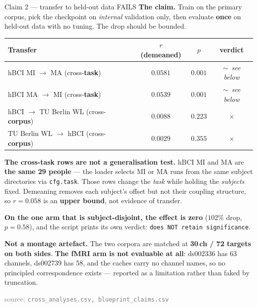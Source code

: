 \documentclass[aspectratio=169,11pt]{beamer}
\newcommand{\no}{\textcolor{bad}{\ensuremath{\times}}}
\newcommand{\pmark}{\textcolor{warn}{\ensuremath{\sim}}}
\newcommand{\src}[1]{{\scriptsize\textcolor{gray}{source: \texttt{#1}}}}
\begin{document}
\begin{frame}{Claim 2 --- transfer to held-out data \quad \textcolor{bad}{FAILS}}
\textbf{The claim.} Train on the primary corpus, pick the checkpoint on
\emph{internal} validation only, then evaluate \textbf{once} on held-out data with
no tuning. The drop should be bounded.

\begin{center}\small
\begin{tabular}{lccc}
\toprule
Transfer & $r$ (demeaned) & $p$ & verdict \\
\midrule
hBCI MI $\rightarrow$ MA \quad(cross-\textbf{task}) & $0.0581$ & $0.001$ & \pmark\ \emph{see below} \\
hBCI MA $\rightarrow$ MI \quad(cross-\textbf{task}) & $0.0539$ & $0.001$ & \pmark\ \emph{see below} \\
hBCI $\rightarrow$ TU Berlin WL (cross-\textbf{corpus}) & $0.0088$ & $0.223$ & \no \\
TU Berlin WL $\rightarrow$ hBCI (cross-\textbf{corpus}) & $0.0029$ & $0.355$ & \no \\
\bottomrule
\end{tabular}
\end{center}

\vspace{0.4em}
\textcolor{bad}{\textbf{The cross-task rows are not a generalisation test.}}
hBCI MI and MA are \textbf{the same 29 people} --- the loader selects MI or MA
runs from the same subject directories via \texttt{cfg.task}. Those rows change
the \emph{task} while holding the \emph{subjects} fixed. Demeaning removes each
subject's offset but not their coupling structure, so $r=0.058$ is an
\textbf{upper bound}, not evidence of transfer.

\vspace{0.4em}
\textbf{On the one arm that is subject-disjoint, the effect is zero}
($102\%$ drop, $p=0.58$), and the script prints its own verdict:
\texttt{does NOT retain significance}.

\vspace{0.4em}
\textbf{Not a montage artefact.} The two corpora are matched at
\textbf{30\,ch / 72 targets on both sides}. \textbf{The fMRI arm is not evaluable
at all}: ds002336 has 63 channels, ds002739 has 58, and the caches carry no
channel names, so no principled correspondence exists --- reported as a
limitation rather than faked by truncation.

\vspace{0.3em}
\src{cross\_analyses.csv, blueprint\_claims.csv}
\end{frame}
\end{document}
